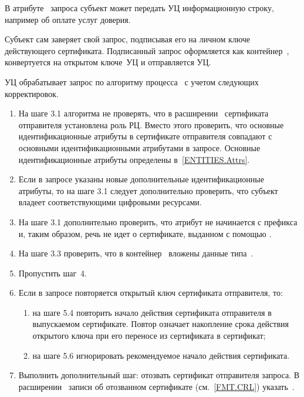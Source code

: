 В атрибуте~ запроса субъект может передать УЦ
информационную строку, например об оплате услуг доверия.

Субъект сам заверяет свой запрос, подписывая его на личном ключе действующего
сертификата. Подписанный запрос оформляется как контейнер~,
конвертуется на открытом ключе~УЦ и отправляется УЦ.

УЦ обрабатывает запрос по алгоритму процесса~ с учетом следующих
корректировок.
\begin{enumerate}
\item
На шаге 3.1 алгоритма не проверять, что в расширении~
сертификата отправителя установлена роль РЦ. Вместо этого проверить, что
основные идентификационные атрибуты в сертификате отправителя совпадают с
основными идентификационными атрибутами в запросе. Основные идентификационные
атрибуты определены в~\ref{ENTITIES.Attrs}.

\item
Если в запросе указаны новые дополнительные идентификационные атрибуты, то на
шаге 3.1 следует дополнительно проверить, что субъект владеет соответствующими
цифровыми ресурсами.

\item
На шаге 3.1 дополнительно проверить, что атрибут  не
начинается с префикса  и, таким образом, речь не идет о сертификате,
выданном с помощью .
 
\item
На шаге 3.3 проверить, что в контейнер~ вложены данные 
типа~. 

\item
Пропустить шаг~4.

\item
Если в запросе повторяется открытый ключ сертификата отправителя, то:
\begin{enumerate}
\item
на шаге 5.4 повторить начало действия сертификата отправителя в выпускаемом
сертификате. Повтор означает накопление срока действия открытого ключа при его
переносе из сертификата в сертификат;


\item
на шаге 5.6 игнорировать рекомендуемое начало действия сертификата.
\end{enumerate}

\item
Выполнить дополнительный шаг: отозвать сертификат отправителя запроса.
%
В расширении~ записи об отозванном сертификате 
(см.~\ref{FMT.CRL}) указать~.
\end{enumerate}

